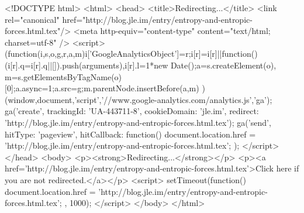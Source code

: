 <!DOCTYPE html>
<html>
<head>
<title>Redirecting...</title>
<link rel="canonical" href="http://blog.jle.im/entry/entropy-and-entropic-forces.html.tex"/>
<meta http-equiv="content-type" content="text/html; charset=utf-8" />
<script>
(function(i,s,o,g,r,a,m){i['GoogleAnalyticsObject']=r;i[r]=i[r]||function(){
(i[r].q=i[r].q||[]).push(arguments)},i[r].l=1*new Date();a=s.createElement(o),
m=s.getElementsByTagName(o)[0];a.async=1;a.src=g;m.parentNode.insertBefore(a,m)
})(window,document,'script','//www.google-analytics.com/analytics.js','ga');
ga('create', { trackingId: 'UA-443711-8', cookieDomain: 'jle.im', redirect: 'http://blog.jle.im/entry/entropy-and-entropic-forces.html.tex'});
ga('send', { hitType: 'pageview', hitCallback: function() { document.location.href = 'http://blog.jle.im/entry/entropy-and-entropic-forces.html.tex'; } });
</script>
</head>
<body>
  <p><strong>Redirecting...</strong></p>
  <p><a href='http://blog.jle.im/entry/entropy-and-entropic-forces.html.tex'>Click here if you are not redirected.</a></p>
  <script>
    setTimeout(function() { document.location.href = 'http://blog.jle.im/entry/entropy-and-entropic-forces.html.tex'; }, 1000);
  </script>
</body>
</html>

